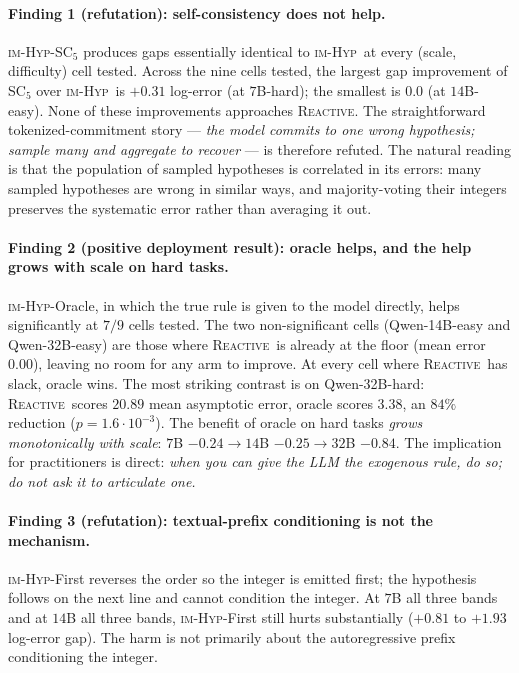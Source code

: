 \documentclass[11pt]{article}
\newcommand{\imhyp}{\textsc{im-Hyp}}
\newcommand{\reactive}{\textsc{Reactive}}
\begin{document}
\paragraph{Finding 1 (refutation): self-consistency does not help.}
\imhyp{}-SC$_5$ produces gaps essentially identical to \imhyp\ at
every (scale, difficulty) cell tested.  Across the nine cells
tested, the largest gap improvement of SC$_5$ over \imhyp\ is
$+0.31$ log-error (at $7$B-hard); the smallest is $0.0$ (at
$14$B-easy).  None of these improvements approaches \reactive.
The straightforward tokenized-commitment story --- \emph{the
model commits to one wrong hypothesis; sample many and aggregate
to recover} --- is therefore refuted.  The natural reading is
that the population of sampled hypotheses is correlated in its
errors: many sampled hypotheses are wrong in similar ways, and
majority-voting their integers preserves the systematic error
rather than averaging it out.

\paragraph{Finding 2 (positive deployment result):  oracle
helps, and the help grows with scale on hard tasks.}
\imhyp{}-Oracle, in which the true rule is given to the model
directly, helps significantly at $7/9$ cells tested.  The two
non-significant cells (Qwen-14B-easy and Qwen-32B-easy) are
those where \reactive\ is already at the floor (mean error
$0.00$), leaving no room for any arm to improve.  At every cell
where \reactive\ has slack, oracle wins.  The most striking
contrast is on Qwen-32B-hard: \reactive\ scores $20.89$ mean
asymptotic error, oracle scores $3.38$, an $84\%$ reduction
($p = 1.6 \cdot 10^{-3}$).  The benefit of oracle on hard tasks
\emph{grows monotonically with scale}:  $7$B
$-0.24 \to 14$B $-0.25 \to 32$B $-0.84$.  The implication for
practitioners is direct: \emph{when you can give the LLM the
exogenous rule, do so; do not ask it to articulate one.}

\paragraph{Finding 3 (refutation):  textual-prefix conditioning
is not the mechanism.}  \imhyp{}-First reverses the order so the
integer is emitted first; the hypothesis follows on the next line
and cannot condition the integer.  At $7$B all three bands and at
$14$B all three bands, \imhyp{}-First still hurts substantially
($+0.81$ to $+1.93$ log-error gap).  The harm is not primarily
about the autoregressive prefix conditioning the integer.
\end{document}
